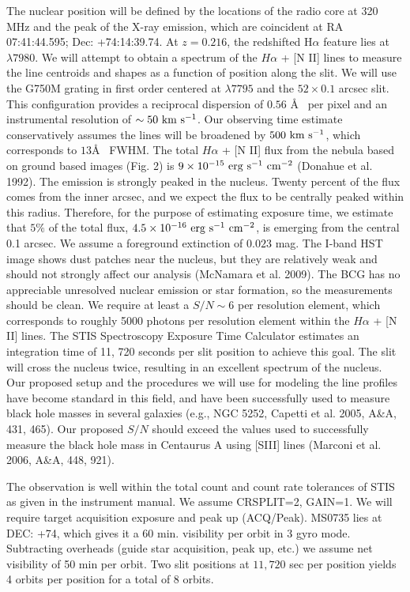 \documentclass[12pt]{article}
\begin{document}
The nuclear position will be defined by the locations of the radio core at 320 MHz and the peak of the X-ray emission,
which are coincident at RA 07:41:44.595; Dec: +74:14:39.74.  At $z=0.216$, the redshifted H$\alpha$ feature lies at $\lambda 7980$.  We will 
attempt to obtain a spectrum of the $H\alpha$ + [N II] lines to measure the line centroids and shapes as
a function of position along the slit.  We will use
the G750M grating in first order centered at $\lambda 7795$ and the $52\times 0.1$ arcsec slit. 
 This configuration provides a reciprocal dispersion of $0.56$ \AA~ per pixel and an instrumental resolution of $\sim 50~\rm km~s^{-1}$.  Our observing time estimate conservatively assumes the lines will be broadened by $500~\rm km~s^{-1}$,
 which corresponds to $13$\AA~ FWHM.   The total $H\alpha$ + [N II]  flux from the nebula based on ground based images (Fig. 2)
is $9\times 10^{-15}~\rm erg~s^{-1}~cm^{-2}$ (Donahue et al. 1992).  The emission is strongly peaked in the nucleus. Twenty percent of the flux comes from the inner arcsec, and we expect the flux to be centrally peaked within this radius.  Therefore, for the purpose
of estimating exposure time, we estimate that $5\%$ of the total flux, $4.5\times 10^{-16}~\rm erg~s^{-1}~cm^{-2}$, is emerging from the central 0.1 arcsec.  We assume a foreground extinction of $0.023$ mag.  The I-band HST image
shows dust patches near the nucleus, but they are relatively weak and should not strongly affect our analysis (McNamara
et al. 2009).  The BCG has no appreciable unresolved nuclear emission or star formation, so the measurements should
be clean.   We require at least
a $S/N\sim 6$ per resolution element, which corresponds to roughly 5000 photons per resolution element within
the $H\alpha$ + [N II] lines.  The STIS Spectroscopy Exposure Time Calculator estimates an integration time of 11, 720 seconds per slit position to achieve this goal.  The slit will cross the nucleus twice, resulting in an excellent spectrum
of the nucleus.   Our proposed setup and the procedures we will use for modeling the line profiles have become standard in this field, and have been successfully used to
measure black hole masses in several galaxies (e.g., NGC 5252, Capetti et al. 2005, A\&A, 431, 465).  Our
proposed $S/N$ should exceed the values used to successfully measure the black hole mass in Centaurus A using
[SIII] lines (Marconi et al. 2006, A\&A, 448, 921).

 
The observation is well within the total count and count rate tolerances of STIS as given in the instrument manual.  
We assume CRSPLIT=2, GAIN=1.  We will require target acquisition exposure and peak up (ACQ/Peak).  MS0735
lies at DEC: +74, which gives it a 60 min. visibility per orbit in 3 gyro mode.  Subtracting overheads (guide star
acquisition, peak up, etc.) we assume net visibility of 50 min per orbit.  Two slit positions at $11, 720$ sec per position
yields 4 orbits per position for a total of 8 orbits.
\end{document}
